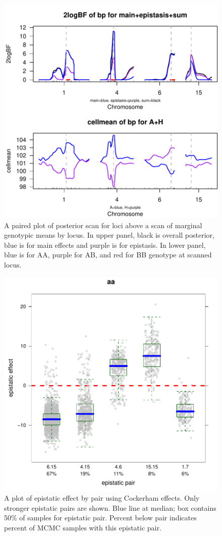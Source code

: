 \documentclass{article}
\begin{document}
\begin{figure}
\includegraphics{qtlbimPDF/FIG-QBHPD}
\caption{A paired plot of posterior scan for loci above a scan of
marginal genotypic means by locus. In upper panel, black is overall
posterior, blue is for main effects and purple is for epistasis. In
lower panel, blue is for AA, purple for AB, and red for BB genotype at
scanned locus.}
\label{figPlotQBHPD}
\end{figure}


\begin{figure}
\includegraphics{qtlbimPDF/FIG-QBEPI}
\caption{A plot of epistatic effect by pair using Cockerham
effects. Only stronger epistatic pairs are shown. Blue line at median;
box contains 50\% of samples for epistatic pair. Percent below pair
indicates percent of MCMC samples with this epistatic pair.}
\label{figPlotQBEPI}
\end{figure}
\end{document}
